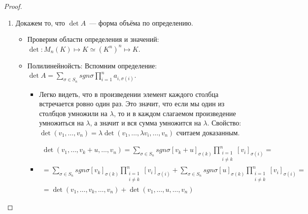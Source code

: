 \begin{proof}\leavevmode
    \begin{enumerate}
        \item 
            Докажем то, что $\det A$~--- форма объёма по определению.

            \begin{itemize}
                \item Проверим области определения и значений: $\det\colon M_n(K)\mapsto K \simeq (K^n)^n \mapsto K$.
                \item Полилинейнойсть:
                    Вспомним определение: 
                    $\det A = \sum\limits_{\sigma\in S_n} {sgn\sigma \prod\limits_{i = 1}^{n}{a_{i, \sigma(i)}}}$. 
                    \begin{itemize}
                        \item 
                            Легко видеть, что в произведении элемент каждого столбца встречается ровно один раз.
                            Это значит, что если мы один из столбцов умножили на $\lambda$, то и в каждом слагаемом
                            произведение умножиться на $\lambda$, а значит и вся сумма умножится на $\lambda$. 
                            Свойство: $\det (v_1,\dots, v_n) = \lambda \det (v_1, \dots, \lambda v_i, \dots, v_n)$
                            считаем доказанным.
                        \item
                            \[
                            \begin{gathered}
                                \det (v_1,\dots, v_k + u, \dots, v_n) = 
                                \sum\limits_{\sigma\in S_n} {sgn\sigma[v_k + u]_{\sigma(k)} \prod\limits_{\substack{i = 1\\i\not=k}}^{n}{[v_i]_{\sigma(i)}}}=\\=
                                \sum\limits_{\sigma\in S_n} {sgn\sigma[v_k]_{\sigma(k)} \prod\limits_{\substack{i = 1\\i\not=k}}^{n}{[v_i]_{\sigma(i)}}}+
                                \sum\limits_{\sigma\in S_n} {sgn\sigma[u]_{\sigma(k)} \prod\limits_{\substack{i = 1\\i\not=k}}^{n}{[v_i]_{\sigma(i)}}}=\\=
                                \det (v_1,\dots, v_k, \dots, v_n) + 
                                \det (v_1,\dots, u, \dots, v_n) 
                            \end{gathered}
                            \] 
                    \end{itemize}

\end{itemize}
\end{enumerate}
\end{proof}
